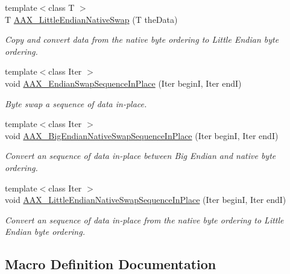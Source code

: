 \begin{DoxyCompactItemize}
{\footnotesize template$<$class T $>$ }\\T \hyperlink{a00205_a49f57c502ff278b26260b1744da99633}{A\+A\+X\+\_\+\+Little\+Endian\+Native\+Swap} (T the\+Data)
\begin{DoxyCompactList}\small\item\em Copy and convert data from the native byte ordering to Little Endian byte ordering. \end{DoxyCompactList}\item 
{\footnotesize template$<$class Iter $>$ }\\void \hyperlink{a00205_ae58f8ce3c8247e07d49e17c011ec5366}{A\+A\+X\+\_\+\+Endian\+Swap\+Sequence\+In\+Place} (Iter begin\+I, Iter end\+I)
\begin{DoxyCompactList}\small\item\em Byte swap a sequence of data in-\/place. \end{DoxyCompactList}\item 
{\footnotesize template$<$class Iter $>$ }\\void \hyperlink{a00205_ae9e72785a26249cd3e3c05baf8c9ce70}{A\+A\+X\+\_\+\+Big\+Endian\+Native\+Swap\+Sequence\+In\+Place} (Iter begin\+I, Iter end\+I)
\begin{DoxyCompactList}\small\item\em Convert an sequence of data in-\/place between Big Endian and native byte ordering. \end{DoxyCompactList}\item 
{\footnotesize template$<$class Iter $>$ }\\void \hyperlink{a00205_a4d8bcdfb048c8124f1f2886537e65678}{A\+A\+X\+\_\+\+Little\+Endian\+Native\+Swap\+Sequence\+In\+Place} (Iter begin\+I, Iter end\+I)
\begin{DoxyCompactList}\small\item\em Convert an sequence of data in-\/place from the native byte ordering to Little Endian byte ordering. \end{DoxyCompactList}\end{DoxyCompactItemize}


\subsection{Macro Definition Documentation}
\hypertarget{a00205_a8bad80e5aaa9c0a227bf53589dfa181b}{}
